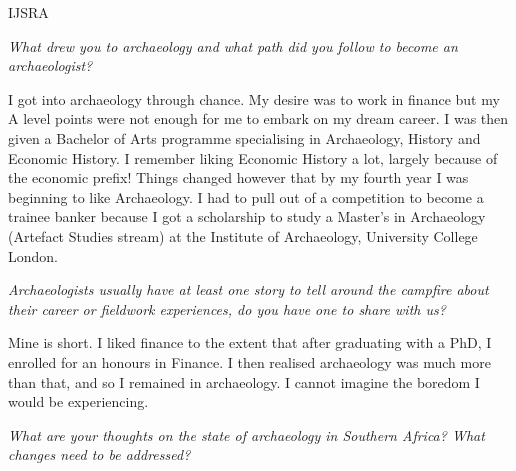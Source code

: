 \documentclass[%
	]{ijsra}
\begin{document}
\begin{labeling}{IJSRA}	
\item[IJSRA (International Journal of Student Research in Archaeology)] \emph{What drew you to archaeology and what path did you follow to become an archaeologist? }
	
\item[Shadreck Chirikure (SC)] I got into archaeology through chance. My desire was to work in finance but my A level points were not enough for me to embark on my dream career. I was then given a Bachelor of Arts programme specialising in Archaeology, History and Economic History. I remember liking Economic History a lot, largely because of the economic prefix! Things changed however that by my fourth year I was beginning to like Archaeology. I had to pull out of a competition to become a trainee banker because I got a scholarship to study a Master’s in Archaeology (Artefact Studies stream) at the Institute of Archaeology, University College London.


\item[IJSRA] \emph{Archaeologists usually have at least one story to tell around the campfire about their career or fieldwork experiences, do you have one to share with us?}
	
\item[SC] Mine is short. I liked finance to the extent that after graduating with a PhD, I enrolled for an honours in Finance. I then realised archaeology was much more than that, and so I remained in archaeology. I cannot imagine the boredom I would be experiencing.

\item[IJSRA] \emph{What are your thoughts on the state of archaeology in Southern Africa? What changes need to be addressed?}
	

\end{labeling}
\end{document}
